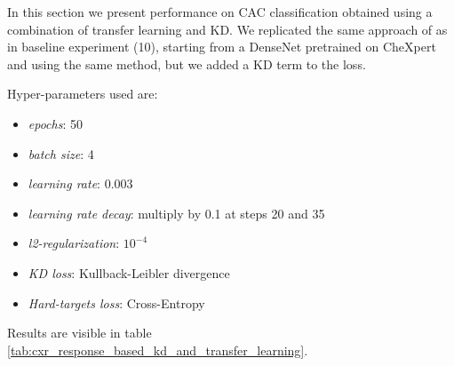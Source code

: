 In this section we present performance on CAC classification obtained using a combination of transfer learning and KD.
We replicated the same approach of \cite{iodice_2022} as in baseline experiment (10), starting from a DenseNet pretrained on CheXpert and using the same method, but we added a KD term to the loss.

Hyper-parameters used are:
\begin{itemize}
    \item \emph{epochs}: 50
    \item \emph{batch size}: 4
    \item \emph{learning rate}: 0.003
    \item \emph{learning rate decay}: multiply by 0.1 at steps 20 and 35
    \item \emph{l2-regularization}: $10^{-4}$
    \item \emph{KD loss}: Kullback-Leibler divergence
    \item \emph{Hard-targets loss}: Cross-Entropy
\end{itemize}
Results are visible in table \ref{tab:cxr_response_based_kd_and_transfer_learning}.

